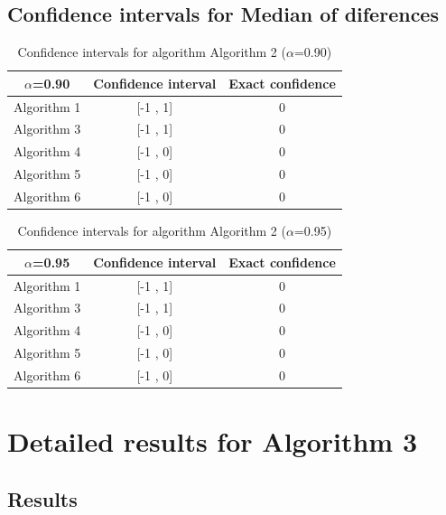 \documentclass[a4paper,10pt]{article}
\begin{document}
\subsection{Confidence intervals for Median of diferences}

\begin{table}[!htp]
\centering\small
\begin{tabular}{
|c|c|c|}
\hline
 $\alpha$=0.90 & Confidence interval & Exact confidence \\ \hline 
Algorithm 1 & [-1 , 1] & 0\\ \hline 
Algorithm 3 & [-1 , 1] & 0\\ \hline 
Algorithm 4 & [-1 , 0] & 0\\ \hline 
Algorithm 5 & [-1 , 0] & 0\\ \hline 
Algorithm 6 & [-1 , 0] & 0\\ \hline 

\end{tabular}
\caption{Confidence intervals for algorithm Algorithm 2 ($\alpha$=0.90)}
\end{table}
\begin{table}[!htp]
\centering\small
\begin{tabular}{
|c|c|c|}
\hline
 $\alpha$=0.95 & Confidence interval & Exact confidence \\ \hline 
Algorithm 1 & [-1 , 1] & 0\\ \hline 
Algorithm 3 & [-1 , 1] & 0\\ \hline 
Algorithm 4 & [-1 , 0] & 0\\ \hline 
Algorithm 5 & [-1 , 0] & 0\\ \hline 
Algorithm 6 & [-1 , 0] & 0\\ \hline 

\end{tabular}
\caption{Confidence intervals for algorithm Algorithm 2 ($\alpha$=0.95)}
\end{table}

 \clearpage 


\section{Detailed results for Algorithm 3}


\subsection{Results}
\end{document}
